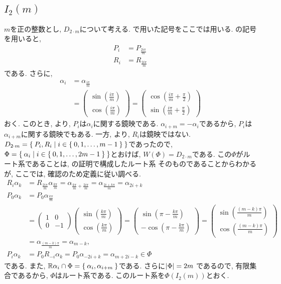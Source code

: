 \subsection{$I_2(m)$}
\label{ex:i2m:root}
$m$を正の整数とし,
$D_{2\cdot m}$について考える.
で用いた記号をここでは用いる.
の記号を用いると,
\begin{align*}
  P_i&=P_{\frac{2i\pi}{m}}\\
  R_i&=R_{\frac{2i\pi}{m}}
\end{align*}
である. さらに,
\begin{align*}
  \alpha_i&=\alpha_{\frac{i\pi}{m}}\\
  &=
  \begin{pmatrix}
    \sin(\frac{i\pi}{m})\\
    \cos(\frac{i\pi}{m})
  \end{pmatrix}
  =
  \begin{pmatrix}
    \cos(\frac{i\pi}{m}+\frac{\pi}{2})\\
    \sin(\frac{i\pi}{m}+\frac{\pi}{2})
  \end{pmatrix} 
\end{align*}
おく. 
このとき,
より, $P_i$は$\alpha_i$に関する鏡映である.
$\alpha_{i+m}=-\alpha_i$であるから,  $P_i$は$\alpha_{i+m}$に関する鏡映でもある.
一方, より, $R_i$は鏡映ではない.
$D_{2\cdot m}=\Set{P_i,R_i|i \in \Set{0,1,\ldots,m-1}}$であったので,
$\Phi=\Set{\alpha_i | i \in \Set{0,1,\ldots,2m-1} }$とおけば,
$W(\Phi)=D_{2\cdot m}$である.
この$\Phi$がルート系であることは,
の証明で構成したルート系
そのものであることからわかるが,
ここでは, 確認のため定義に従い調べる.
\begin{align*}
  R_i\alpha_k&=R_{\frac{2i\pi}{m}}\alpha_{\frac{k\pi}{m}}
  =\alpha_{\frac{k\pi}{m}+\frac{2i\pi}{m}}
  =\alpha_{\frac{2i+k\pi}{m}}
  =\alpha_{2i+k}\\
  P_0\alpha_k&=P_0\alpha_{\frac{k\pi}{m}}\\
  &=
  \begin{pmatrix}
    1 & 0 \\
    0 & -1
  \end{pmatrix}
  \begin{pmatrix}
    \sin(\frac{k\pi}{m}) \\
    \cos(\frac{k\pi}{m}) 
  \end{pmatrix}
=  \begin{pmatrix}
    \sin(\pi-\frac{k\pi}{m}) \\
    -\cos(\pi-\frac{k\pi}{m}) 
  \end{pmatrix}
=  \begin{pmatrix}
    \sin(\frac{(m-k)\pi}{m}) \\
    \cos(\frac{(m-k)\pi}{m}) 
\end{pmatrix}\\
&=\alpha_{\frac{(m-k)\pi}{m}}=\alpha_{m-k},
\\
P_i\alpha_k&=P_0R_{-i}\alpha_k
=P_0\alpha_{-2i+k}
=\alpha_{m+2i-k} \in \Phi
\end{align*}
である.
また,
$\mathbb{R}\alpha_i \cap \Phi=\Set{\alpha_i,\alpha_{i+m}}$である.
さらに$\left|\Phi\right|=2m$
であるので, 有限集合であるから,
$\Phi$はルート系である.
このルート系を$\Phi(I_2(m))$とおく.

